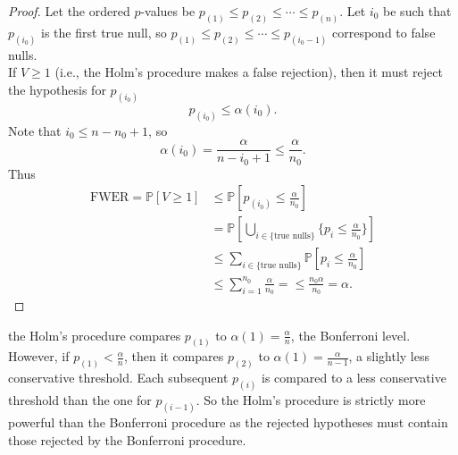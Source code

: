\documentclass[a4paper]{article}
\begin{document}
\begin{proof}
	Let the ordered $p$-values be $p_{(1)} \leq p_{(2)} \leq \cdots \leq p_{(n)}$. Let $i_0$ be such that $p_{(i_0)}$ is the first true null, so $p_{(1)} \leq p_{(2)} \leq \cdots \leq p_{(i_0 -1)}$ correspond to false nulls. \\
	If $V \geq 1$ (i.e., the Holm's procedure makes a false rejection), then it must reject the hypothesis for $p_{(i_0)}$
	\begin{equation*}
		p_{(i_0)} \leq \alpha(i_0).
	\end{equation*}
	Note that $i_0 \leq n - n_0 + 1$, so
	\begin{equation*}
		\alpha(i_0) = \frac{\alpha}{n-i_0+1} \leq \frac{\alpha}{n_0}.
	\end{equation*}
	Thus
	\begin{equation}
		\begin{aligned}
			\text{FWER} = \mathbb{P}[V \geq 1] &\leq \mathbb{P}[p_{(i_0)} \leq \frac{\alpha}{n_0}] \\
			&= \mathbb{P}\left[\bigcup\limits_{i \in \{ \text{true nulls} \}} \{p_i \leq \frac{\alpha}{n_0}\}
			\right] \\
			&\leq \sum\limits_{i \in \{ \text{true nulls} \}} \mathbb{P}\left[p_i \leq \frac{\alpha}{n_0}\right] \\
			&\leq \sum\limits_{i=1}^{n_0} \frac{\alpha}{n_0} = \leq \frac{n_0 \alpha}{n_0} = \alpha.
		\end{aligned}
	\end{equation}
\end{proof}

\begin{remark}
	the Holm's procedure compares $p_{(1)}$ to $\alpha(1) = \frac{\alpha}{n}$, the Bonferroni level. However, if $p_{(1)} < \frac{\alpha}{n}$, then it compares $p_{(2)}$ to $\alpha(1) = \frac{\alpha}{n-1}$, a slightly less conservative threshold. Each subsequent $p_{(i)}$ is compared to a less conservative threshold than the one for $p_{(i-1)}$. So the Holm's procedure is strictly more powerful than the Bonferroni procedure as the rejected hypotheses must contain those rejected by the Bonferroni procedure.
\end{remark}
\end{document}
